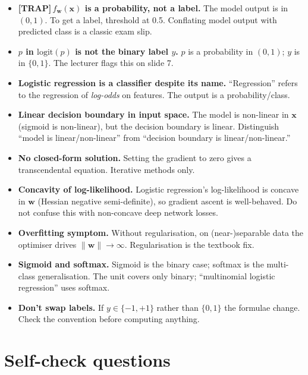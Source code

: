 \documentclass[11pt, a4paper]{article}
\newcommand{\trapflag}{\textcolor{trapBd}{\textbf{[TRAP]}}\,}
\begin{document}
\begin{itemize}
  \item \trapflag{}\textbf{$f_\mathbf{w}(\mathbf{x})$ is a probability, not a label.} The model output is in $(0,1)$. To get a label, threshold at 0.5. Conflating model output with predicted class is a classic exam slip.
  \item \textbf{$p$ in $\mathrm{logit}(p)$ is not the binary label $y$.} $p$ is a probability in $(0,1)$; $y$ is in $\{0,1\}$. The lecturer flags this on slide 7.
  \item \textbf{Logistic regression is a classifier despite its name.} ``Regression'' refers to the regression of \emph{log-odds} on features. The output is a probability/class.
  \item \textbf{Linear decision boundary in input space.} The model is non-linear in $\mathbf{x}$ (sigmoid is non-linear), but the decision boundary is linear. Distinguish ``model is linear/non-linear'' from ``decision boundary is linear/non-linear.''
  \item \textbf{No closed-form solution.} Setting the gradient to zero gives a transcendental equation. Iterative methods only.
  \item \textbf{Concavity of log-likelihood.} Logistic regression's log-likelihood is concave in $\mathbf{w}$ (Hessian negative semi-definite), so gradient ascent is well-behaved. Do not confuse this with non-concave deep network losses.
  \item \textbf{Overfitting symptom.} Without regularisation, on (near-)separable data the optimiser drives $\|\mathbf{w}\|\to\infty$. Regularisation is the textbook fix.
  \item \textbf{Sigmoid and softmax.} Sigmoid is the binary case; softmax is the multi-class generalisation. The unit covers only binary; ``multinomial logistic regression'' uses softmax.
  \item \textbf{Don't swap labels.} If $y\in\{-1,+1\}$ rather than $\{0,1\}$ the formulae change. Check the convention before computing anything.
\end{itemize}

\section*{Self-check questions}
\end{document}
